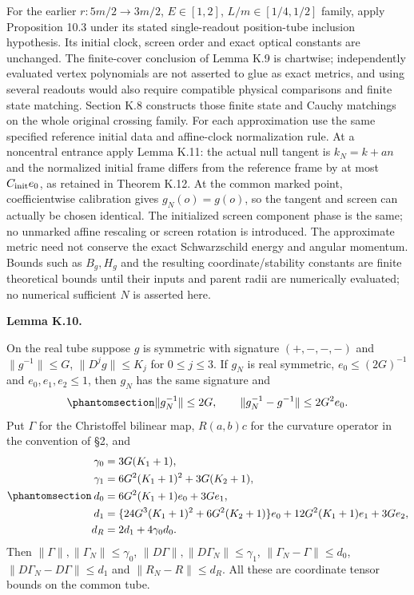 \documentclass[
  english,
  11pt,
  reqno]{amsart}
\makeatletter
\newcommand{\pandocstatementheading}[1]{%
  \par\addpenalty{\@beginparpenalty}%
  \addvspace{.5\baselineskip plus .2\baselineskip minus .2\baselineskip}%
  {\normalfont\bfseries #1\par}%
  \nobreak\@afterindenttrue\@afterheading
}
\makeatother
\begin{document}
For the earlier \(r:5m/2\to3m/2\), \(E\in[1,2]\), \(L/m\in[1/4,1/2]\)
family, apply Proposition 10.3 under its stated single-readout
position-tube inclusion hypothesis. Its initial clock, screen order and
exact optical constants are unchanged. The finite-cover conclusion of
Lemma K.9 is chartwise; independently evaluated vertex polynomials are
not asserted to glue as exact metrics, and using several readouts would
also require compatible physical comparisons and finite state matching.
Section K.8 constructs those finite state and Cauchy matchings on the
whole original crossing family. For each approximation use the same
specified reference initial data and affine-clock normalization rule. At
a noncentral entrance apply Lemma K.11: the actual null tangent is
\(k_N=k+an\) and the normalized initial frame differs from the reference
frame by at most \(C_{\rm init}e_0\), as retained in Theorem K.12. At
the common marked point, coefficientwise calibration gives
\(g_N(o)=g(o)\), so the tangent and screen can actually be chosen
identical. The initialized screen component phase is the same; no
unmarked affine rescaling or screen rotation is introduced. The
approximate metric need not conserve the exact Schwarzschild energy and
angular momentum. Bounds such as \(B_g,H_g\) and the resulting
coordinate/stability constants are finite theoretical bounds until their
inputs and parent radii are numerically evaluated; no numerical
sufficient \(N\) is asserted here.

\pandocstatementheading{\protect{}\label{lem:sh-inverse-curvature-stability}Lemma K.10.}

On the real tube suppose \(g\) is symmetric with signature \((+,-,-,-)\)
and \(\|g^{-1}\|\le G\), \(\|D^jg\|\le K_j\) for \(0\le j\le3\). If
\(g_N\) is real symmetric, \(e_0\le(2G)^{-1}\) and \(e_0,e_1,e_2\le1\),
then \(g_N\) has the same signature and
\begin{equation}\protect\phantomsection\label{eq:sh-inverse-margin}{
 \|g_N^{-1}\|\le2G,\qquad
 \|g_N^{-1}-g^{-1}\|\le2G^2e_0.
}\end{equation} Put \(\Gamma\) for the Christoffel bilinear map,
\(R(a,b)c\) for the curvature operator in the convention of §2, and
\begin{equation}\protect\phantomsection\label{eq:sh-connection-error-constants}{
 \begin{aligned}
 \gamma_0&=3G(K_1+1),\\
 \gamma_1&=6G^2(K_1+1)^2+3G(K_2+1),\\
 d_0&=6G^2(K_1+1)e_0+3Ge_1,\\
 d_1&=\{24G^3(K_1+1)^2+6G^2(K_2+1)\}e_0
       +12G^2(K_1+1)e_1+3Ge_2,\\
 d_R&=2d_1+4\gamma_0d_0.
 \end{aligned}
}\end{equation} Then \(\|\Gamma\|,\|\Gamma_N\|\le\gamma_0\),
\(\|D\Gamma\|,\|D\Gamma_N\|\le\gamma_1\),
\(\|\Gamma_N-\Gamma\|\le d_0\), \(\|D\Gamma_N-D\Gamma\|\le d_1\) and
\(\|R_N-R\|\le d_R\). All these are coordinate tensor bounds on the
common tube.
\end{document}
